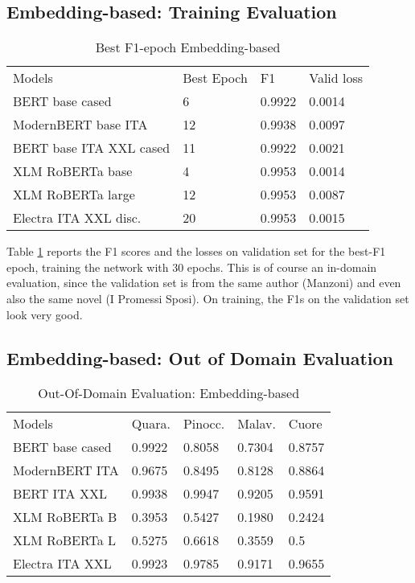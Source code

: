 \documentclass[11pt]{article}
\begin{document}
\subsection{Embedding-based: Training Evaluation}

\begin{table}[]
	\small
	\caption{Best F1-epoch Embedding-based}
	\begin{tabular}{llll}
		Models & Best Epoch & F1 & Valid loss \\
		BERT base cased & 6      & 0.9922        & 0.0014                  \\
		ModernBERT base ITA  & 12      & 0.9938        & 0.0097                  \\
		BERT base ITA XXL cased & 11      & 0.9922        & 0.0021                 \\
		XLM RoBERTa base & 4       & 0.9953        & 0.0014                  \\
		XLM RoBERTa large & 12       & 0.9953       & 0.0087                 \\
		Electra ITA XXL disc. & 20       & 0.9953        & 0.0015                
	\end{tabular}
	\label{t1}
\end{table}

Table \ref{t1} reports the F1 scores and the losses on validation set 
for the best-F1 epoch, training the network with 30 epochs.
This is of course an in-domain evaluation, since the validation set
is from the same author (Manzoni) and even also the same novel
(I Promessi Sposi).
On training, the F1s on the validation set look very good.

\subsection{Embedding-based: Out of Domain Evaluation}

\begin{table}[]
	\small
	\caption{Out-Of-Domain Evaluation: Embedding-based}
	\begin{tabular}{lllll}
		Models & Quara. & Pinocc. & Malav. & Cuore \\
		BERT base cased & 0.9922      & 0.8058 & 0.7304        & 0.8757                  \\
		ModernBERT ITA  & 0.9675     & 0.8495   & 0.8128   & 0.8864                  \\
		BERT ITA XXL  & 0.9938      & 0.9947   & 0.9205     & 0.9591                 \\
		XLM RoBERTa B & 0.3953       & 0.5427   & 0.1980     & 0.2424                 \\
		XLM RoBERTa L & 0.5275       & 0.6618    & 0.3559   & 0.5               \\
		Electra ITA XXL  & 0.9923       & 0.9785    & 0.9171    & 0.9655             
	\end{tabular}
	\label{t2}
\end{table}
\end{document}
